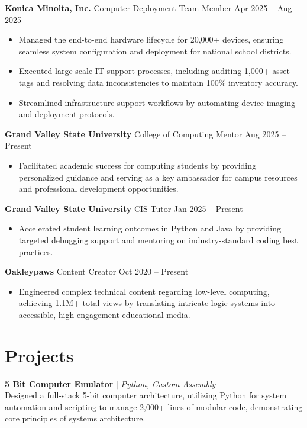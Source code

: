 \documentclass[10pt,letterpaper]{article}
\begin{document}
\textbf{Konica Minolta, Inc.} \hfill Computer Deployment Team Member \hfill Apr 2025 -- Aug 2025 \\
\begin{itemize}
    \item Managed the end-to-end hardware lifecycle for 20,000+ devices, ensuring seamless system configuration and deployment for national school districts.
    \item Executed large-scale IT support processes, including auditing 1,000+ asset tags and resolving data inconsistencies to maintain 100\% inventory accuracy.
    \item Streamlined infrastructure support workflows by automating device imaging and deployment protocols.
\end{itemize}

\textbf{Grand Valley State University} \hfill College of Computing Mentor \hfill Aug 2025 -- Present \\
\begin{itemize}
    \item Facilitated academic success for computing students by providing personalized guidance and serving as a key ambassador for campus resources and professional development opportunities.
\end{itemize}

\textbf{Grand Valley State University} \hfill CIS Tutor \hfill Jan 2025 -- Present \\
\begin{itemize}
    \item Accelerated student learning outcomes in Python and Java by providing targeted debugging support and mentoring on industry-standard coding best practices.
\end{itemize}

\textbf{Oakleypaws} \hfill Content Creator \hfill Oct 2020 -- Present \\
\begin{itemize}
    \item Engineered complex technical content regarding low-level computing, achieving 1.1M+ total views by translating intricate logic systems into accessible, high-engagement educational media.
\end{itemize}

\section{Projects}
\textbf{5 Bit Computer Emulator} $|$ \textit{Python, Custom Assembly} \\
Designed a full-stack 5-bit computer architecture, utilizing Python for system automation and scripting to manage 2,000+ lines of modular code, demonstrating core principles of systems architecture.
\end{document}
